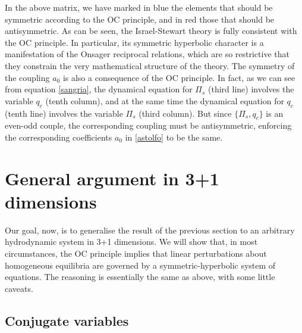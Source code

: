 \documentclass[a4paper, amsfonts, amssymb, amsmath, reprint, showkeys, nofootinbib, twoside, onecolumn,notitlepage]{revtex4-1}
\begin{document}
In the above matrix, we have marked in blue the elements that should be symmetric according to the OC principle, and in red those that should be antisymmetric. As can be seen, the Israel-Stewart theory is fully consistent with the OC principle. In particular, its symmetric hyperbolic character is a manifestation of the Onsager reciprocal relations, which are so restrictive that they constrain the very mathematical structure of the theory. The symmetry of the coupling $a_0$ is also a consequence of the OC principle. In fact, as we can see from equation \eqref{sangria}, the dynamical equation for $\Pi_s$ (third line) involves the variable $q_c$ (tenth column), and at the same time the dynamical equation for $q_c$ (tenth line) involves the variable $\Pi_s$ (third column). But since $\{\Pi_s,q_c \}$ is an even-odd couple, the corresponding coupling must be antisymmetric, enforcing the corresponding coefficients $a_0$ in \eqref{astolfo} to be the same.




\section{General argument in 3+1 dimensions}

Our goal, now, is to generalise the result of the previous section to an arbitrary hydrodynamic system in 3+1 dimensions. We will show that, in most circumstances, the OC principle implies that linear perturbations about homogeneous equilibria are governed by a symmetric-hyperbolic system of equations. The reasoning is essentially the same as above, with some little caveats.

\subsection{Conjugate variables}
\end{document}
